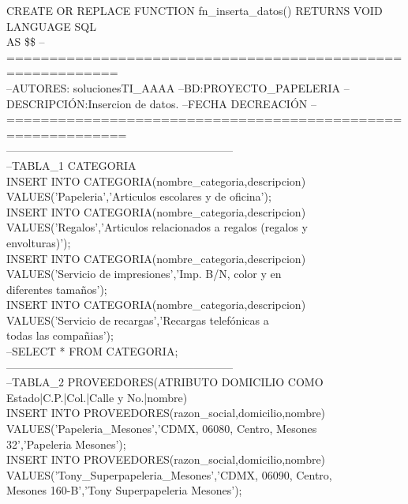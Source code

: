\documentclass[10pt]{report}
\begin{document}
    
    \begin{flushleft} \ttfamily
    
    CREATE OR REPLACE FUNCTION fn\_inserta\_datos() RETURNS VOID
    LANGUAGE SQL\\
    AS
    \$\$
	--===========================================================\\
	--AUTORES: solucionesTI\_AAAA
	--BD:PROYECTO\_PAPELERIA
	--DESCRIPCIÓN:Insercion de datos.
	--FECHA DECREACIÓN 
	--============================================================\\

	--------------------------------------------------------------\\
	--TABLA\_1 CATEGORIA\\
	INSERT INTO CATEGORIA(nombre\_categoria,descripcion)\\
	VALUES('Papeleria','Articulos escolares y de oficina');\\
	INSERT INTO CATEGORIA(nombre\_categoria,descripcion)\\ 
	VALUES('Regalos','Articulos relacionados a regalos (regalos y\\ envolturas)');\\
	INSERT INTO CATEGORIA(nombre\_categoria,descripcion)\\
	VALUES('Servicio de impresiones','Imp. B/N, color y en\\ diferentes tamaños');\\
	INSERT INTO CATEGORIA(nombre\_categoria,descripcion)\\
	VALUES('Servicio de recargas','Recargas telefónicas a \\
	todas las compañias');\\
	--SELECT * FROM CATEGORIA;\\
	--------------------------------------------------------------\\
	--TABLA\_2 PROVEEDORES(ATRIBUTO DOMICILIO COMO\\ Estado|C.P.|Col.|Calle y No.|nombre)\\
	INSERT INTO PROVEEDORES(razon\_social,domicilio,nombre)\\
	VALUES('Papeleria\_Mesones','CDMX, 06080, Centro, Mesones\\ 32','Papeleria Mesones');\\
	INSERT INTO PROVEEDORES(razon\_social,domicilio,nombre)\\
	VALUES('Tony\_Superpapeleria\_Mesones','CDMX, 06090, Centro,\\ Mesones 160-B','Tony Superpapeleria Mesones');\\

\end{flushleft}
\end{document}
